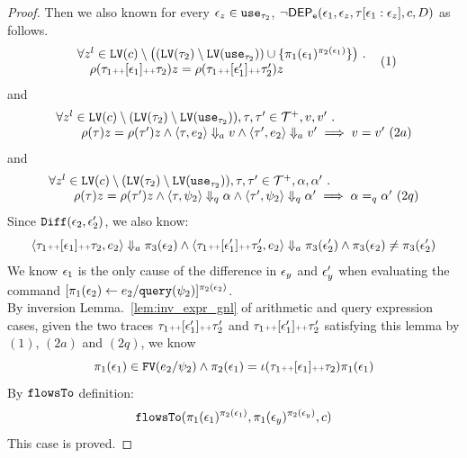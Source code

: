 \begin{proof}
Then we also known for every $\mathtt{\epsilon}_z \in \mathtt{use}_{\mathtt{\tau}_2}$, 
$\neg \mathsf{DEP_{\mathtt{e}}}(\mathtt{\epsilon}_1, \mathtt{\epsilon}_z, \mathtt{\tau}[\mathtt{\epsilon}_1:\mathtt{\epsilon}_z], c, D)$
as follows.
\[
	\begin{array}{l}
		\forall z^l \in \mathtt{LV}(c) \setminus 
	\big( 
		( \mathtt{LV}({\mathtt{\tau}_2}) \setminus \mathtt{LV}({\mathtt{use}_{\mathtt{\tau}_2}})) \cup \{\pi_1(\mathtt{\epsilon}_1)^{\pi_2(\mathtt{\epsilon}_1)}\} \big)
		~.~ 
		\\ \quad 
	\rho(\mathtt{\tau}_1 {\scriptscriptstyle ++} [\mathtt{\epsilon}_1] {\scriptscriptstyle ++} \mathtt{\tau}_2) z = \rho(\mathtt{\tau}_1 {\scriptscriptstyle ++} [\mathtt{\epsilon}_1'] {\scriptscriptstyle ++} \mathtt{\tau}_2') z
\end{array}
~ (1)
\]
and 
\[
	\begin{array}{l}
	\forall z^l \in \mathtt{LV}(c) \setminus ( \mathtt{LV}({\mathtt{\tau}_2}) \setminus \mathtt{LV}({\mathtt{use}_{\mathtt{\tau}_2}})), 
	\mathtt{\tau}, \mathtt{\tau}' \in \mathcal{T}^{+}, v, v' ~.~  
	\\ \qquad
	\rho(\mathtt{\tau}) z = \rho(\mathtt{\tau}') z 
	\land 
	\langle \mathtt{\tau}, e_2 \rangle \Downarrow_a v 
	\land 
	\langle \mathtt{\tau}', e_2 \rangle \Downarrow_a v'
	\implies 
	v = v' 
	~ (2a)
\end{array}
\]
and
\[
	\begin{array}{l}
	\forall z^l \in \mathtt{LV}(c) \setminus ( \mathtt{LV}({\mathtt{\tau}_2}) \setminus \mathtt{LV}({\mathtt{use}_{\mathtt{\tau}_2}})), 
	\mathtt{\tau}, \mathtt{\tau}' \in \mathcal{T}^{+}, \alpha, \alpha' ~.~  
	\\ \qquad
	\rho(\mathtt{\tau}) z = \rho(\mathtt{\tau}') z 
	\land 
	\langle \mathtt{\tau}, \psi_2 \rangle \Downarrow_q \alpha 
	\land 
	\langle \mathtt{\tau}', \psi_2 \rangle \Downarrow_q \alpha'
	\implies 
	\alpha =_q \alpha' 
	~ (2q)
\end{array}
\]
%
Since $\mathtt{Diff}(\mathtt{\epsilon}_2, \mathtt{\epsilon}_2')$, we also know:
%
\[	
\langle \mathtt{\tau}_1 {\scriptscriptstyle ++} [\mathtt{\epsilon}_1] {\scriptscriptstyle ++} \mathtt{\tau}_2, e_2 \rangle \Downarrow_a \pi_3(\mathtt{\epsilon}_2)
\land 
\langle \mathtt{\tau}_1 {\scriptscriptstyle ++} [\mathtt{\epsilon}_1'] {\scriptscriptstyle ++} \mathtt{\tau}_2', e_2 \rangle \Downarrow_a \pi_3(\mathtt{\epsilon}_2') 
\land 
\pi_3(\mathtt{\epsilon}_2) \neq \pi_3(\mathtt{\epsilon}_2')
\]
We know $\mathtt{\epsilon}_1$ is the only cause of the difference in $\mathtt{\epsilon}_y$ and $\mathtt{\epsilon}_y'$ when evaluating
the command 
$\clabel{\assign{\pi_1(\event_2)}{\expr_2 / \query(\qexpr_2)}}{}^{\pi_2(\event_2)}$.
%
\\
By inversion Lemma.~\ref{lem:inv_expr_gnl} of arithmetic and query expression cases, 
given the two traces
$\mathtt{\tau}_1 {\scriptscriptstyle ++} [\mathtt{\epsilon}_1'] {\scriptscriptstyle ++} \mathtt{\tau}_2'$ and 
$\mathtt{\tau}_1 {\scriptscriptstyle ++} [\mathtt{\epsilon}_1'] {\scriptscriptstyle ++} \mathtt{\tau}_2'$ 
satisfying this lemma by $(1)$, $(2a)$ and $(2q)$, 
we know
\[
  \pi_1(\mathtt{\epsilon}_1) \in \mathtt{FV}(e_2 / \psi_2) \land {\pi_2(\ensuremath{\mathtt{\epsilon}}_1)} = \iota(\mathtt{\tau}_1 {\scriptscriptstyle ++} [\mathtt{\epsilon}_1] {\scriptscriptstyle ++} \mathtt{\tau}_2) \pi_1(\mathtt{\epsilon}_1) 
\]
%
By $\mathtt{flowsTo}$ definition:
\[
  \mathtt{flowsTo}(\pi_1(\mathtt{\epsilon}_1)^{\pi_2(\mathtt{\epsilon}_1)}, \pi_1(\mathtt{\epsilon}_y)^{\pi_2(\mathtt{\epsilon}_y)}, c)
\]
This case is proved.
%
\end{proof}
